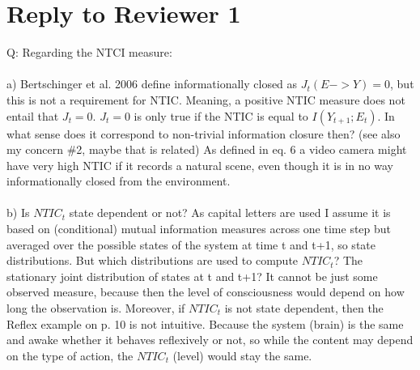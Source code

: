 \documentclass[utf8]{article}
\newcounter{cQuestion}[section]
\newenvironment{question}
    {\refstepcounter{cQuestion}\color{Blue}\noindent\newline Q\thecQuestion:}
    {~\newline}
\begin{document}
    \section{Reply to Reviewer 1}
        \begin{question}
            Regarding the NTCI measure: \\\\
            a) Bertschinger et al. 2006 define informationally closed as $J_t(E -> Y) = 0$, but this is not a requirement for NTIC. Meaning, a positive NTIC measure does not entail that $J_t = 0$. $J_t = 0$ is only true if the NTIC is equal to $I(Y_{t+1}; E_t)$. In what sense does it correspond to non-trivial information closure then? (see also my concern \#2, maybe that is related) As defined in eq. 6 a video camera might have very high NTIC if it records a natural scene, even though it is in no way informationally closed from the environment.\\\\
            b) Is $NTIC_t$ state dependent or not? As capital letters are used I assume it is based on (conditional) mutual information measures across one time step but averaged over the possible states of the system at time t and t+1, so state distributions. But which distributions are used to compute $NTIC_t$? The stationary joint distribution of states at t and t+1? It cannot be just some observed measure, because then the level of consciousness would depend on how long the observation is. Moreover, if $NTIC_t$ is not state dependent, then the Reflex example on p. 10 is not intuitive. Because the system (brain) is the same and awake whether it behaves reflexively or not, so while the content may depend on the type of action, the $NTIC_t$ (level) would stay the same.              
        \end{question}
    
\end{document}
